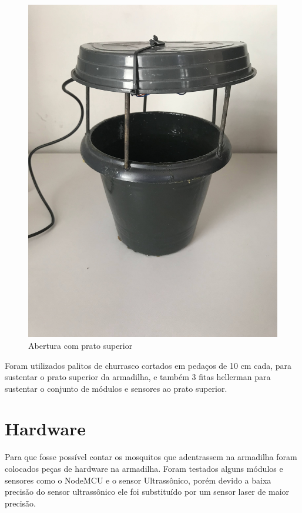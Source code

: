 \documentclass[
	12pt,				%
	openright,			%
	oneside,			%
	a4paper,			%
	chapter=TITLE,		%
	english,			%
	brazil				%
	]{abntex2}
\begin{document}
\begin{figure}[H]
    \centering
    \includegraphics[scale=0.04, angle=-90]{imagens/IMG_0604.jpg}
    \caption{Abertura com prato superior}
    \label{fig:abertura}
\end{figure}   

Foram utilizados palitos de churrasco cortados em pedaços de 10 cm cada, para sustentar o prato superior da armadilha, e também 3 
fitas hellerman para sustentar
o conjunto de módulos e sensores ao prato superior. 


\section{Hardware}

Para que fosse possível contar os mosquitos que adentrassem na armadilha foram colocados peças de hardware na armadilha.
Foram testados alguns módulos e sensores como o NodeMCU e o sensor Ultrassônico, porém devido a baixa precisão do sensor ultrassônico ele 
foi substituído por um sensor laser de maior precisão.
\end{document}

